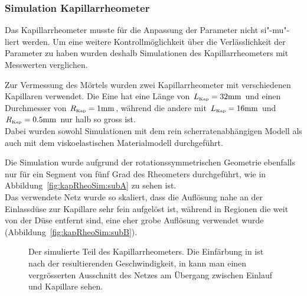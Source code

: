 \subsubsection{Simulation Kapillarrheometer}
Das Kapillarrheometer musste für die Anpassung der Parameter nicht si"-mu"-liert werden. Um eine weitere Kontrollmöglichkeit über die Verlässlichkeit der Parameter zu haben wurden deshalb Simulationen des Kapillarrheometers mit Messwerten verglichen.

Zur Vermessung des Mörtels wurden zwei Kapillarrheometer mit verschiedenen Kapillaren verwendet. Die Eine hat eine Länge von $L_\text{\tiny Kap}=32\mbox{mm}$ und einen Durchmesser von $R_\text{\tiny Kap}=1\mbox{mm}$, während die andere mit $L_\text{\tiny Kap}=16\mbox{mm}$ und $R_\text{\tiny Kap}=0.5\mbox{mm}$ nur halb so gross ist.\\
Dabei wurden sowohl Simulationen mit dem rein scherratenabhängigen Modell als auch mit dem viskoelastischen Materialmodell durchgeführt.

Die Simulation wurde aufgrund der rotationssymmetrischen Geometrie ebenfalls nur für ein Segment von fünf Grad des Rheometers durchgeführt, wie in Abbildung~\ref{fig:kapRheoSim:subA} zu sehen ist.\\
Das verwendete Netz wurde so skaliert, dass die Auflösung nahe an der Einlassdüse zur Kapillare sehr fein aufgelöst ist, während in Regionen die weit von der Düse entfernt sind, eine eher grobe Auflösung verwendet wurde (Abbildung~\ref{fig:kapRheoSim:subB}).
%
\begin{figure}[tb]
    \centering
    \caption{Der simulierte Teil des Kapillarrheometers. Die Einfärbung in  ist nach der resultierenden Geschwindigkeit, in  kann man einen vergrösserten Ausschnitt des Netzes am Übergang zwischen Einlauf und Kapillare sehen.}
    \label{fig:kapRheoSim}
\end{figure}

